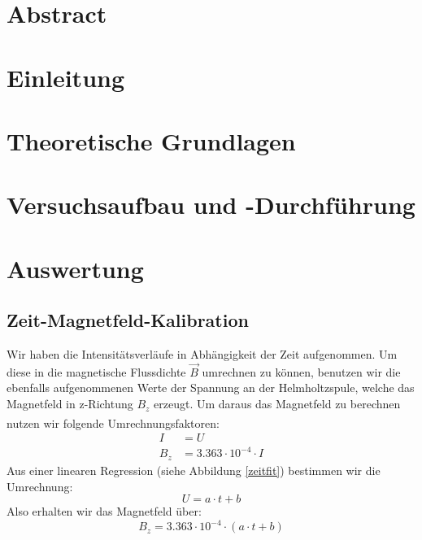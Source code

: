 \documentclass[12pt]{article}
\title{\vspace{0cm}{\Huge Fortgeschrittenen-Praktikum I:\\ \vspace{1cm} Der Hanle-Effekt}}
\author{Saskia Bondza\\Simon Stephan}
\date{durchgeführt am 28. und 29.09.2016}
\begin{document}
\maketitle
\newpage

\section*{Abstract}



\newpage

\thispagestyle{empty}
\tableofcontents
\newpage

\section{Einleitung}


\newpage
\section{Theoretische Grundlagen}


\newpage
\section{Versuchsaufbau und -Durchführung}


\newpage
\section{Auswertung}
\subsection{Zeit-Magnetfeld-Kalibration}
Wir haben die Intensitätsverläufe in Abhängigkeit der Zeit aufgenommen. Um diese in die magnetische Flussdichte $\vec B$ umrechnen zu können, benutzen wir die ebenfalls aufgenommenen Werte der Spannung an der Helmholtzspule, welche das Magnetfeld in z-Richtung $B_z$ erzeugt. Um daraus das Magnetfeld zu berechnen nutzen wir folgende Umrechnungsfaktoren\textsuperscript{\cite{anleitung}}:
\begin{align*}
	I&=U\\
	B_z&=3.363\cdot10^{-4}\cdot I
\end{align*}
Aus einer linearen Regression (siehe Abbildung \ref{zeitfit}) bestimmen wir die Umrechnung: $$U=a\cdot t+b$$ Also erhalten wir das Magnetfeld über: $$B_z=3.363\cdot10^{-4}\cdot(a\cdot t+b)$$
\end{document}
